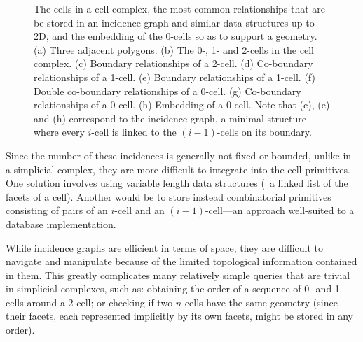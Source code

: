 \begin{figure}[tb]
{\label{subfig:0-cell-double-star}}
\quad
{}
\quad
{}
\caption[Relationships in an incidence graph]{The cells in a cell complex, the most common relationships that are be stored in an incidence graph and similar data structures up to 2D, and the embedding of the 0-cells so as to support a geometry.
(a) Three adjacent polygons.
(b) The 0-, 1- and 2-cells in the cell complex.
(c) Boundary relationships of a 2-cell.
(d) Co-boundary relationships of a 1-cell.
(e) Boundary relationships of a 1-cell.
(f) Double co-boundary relationships of a 0-cell.
(g) Co-boundary relationships of a 0-cell.
(h) Embedding of a 0-cell.
Note that (c), (e) and (h) correspond to the incidence graph, a minimal structure where every $i$-cell is linked to the $(i-1)$-cells on its boundary.}
\label{fig:ds_incidence_graph}
\end{figure}
Since the number of these incidences is generally not fixed or bounded, unlike in a simplicial complex, they are more difficult to integrate into the cell primitives.
One solution involves using variable length data structures (\eg\ a linked list of the facets of a cell).
Another would be to store instead combinatorial primitives consisting of pairs of an $i$-cell and an $(i-1)$-cell---an approach well-suited to a database implementation.

While incidence graphs are efficient in terms of space, they are difficult to navigate and manipulate because of the limited topological information contained in them.
This greatly complicates many relatively simple queries that are trivial in simplicial complexes, such as: obtaining the order of a sequence of 0- and 1-cells around a 2-cell; or checking if two $n$-cells have the same geometry (since their facets, each represented implicitly by its own facets, might be stored in any order).

